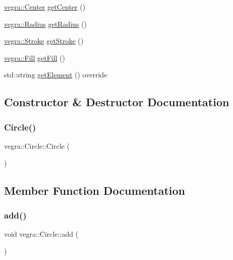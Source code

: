 \begin{DoxyCompactItemize}
\mbox{\hyperlink{structvegra_1_1Center}{vegra\+::\+Center}} \mbox{\hyperlink{structvegra_1_1Circle_a8dd74def2123ae009053c067f653380d}{get\+Center}} ()
\item 
\mbox{\hyperlink{structvegra_1_1Radius}{vegra\+::\+Radius}} \mbox{\hyperlink{structvegra_1_1Circle_ad9eb941c53b548d6944e8d95f9ff1328}{get\+Radius}} ()
\item 
\mbox{\hyperlink{structvegra_1_1Stroke}{vegra\+::\+Stroke}} \mbox{\hyperlink{structvegra_1_1Circle_ab0ab83cb024a9b236c87194fdada9055}{get\+Stroke}} ()
\item 
\mbox{\hyperlink{structvegra_1_1Fill}{vegra\+::\+Fill}} \mbox{\hyperlink{structvegra_1_1Circle_a8f68bc2e3f0469a479d5314b81aeffc8}{get\+Fill}} ()
\item 
std\+::string \mbox{\hyperlink{structvegra_1_1Circle_a50bdbe7e4b29530b131e7a1157190b00}{get\+Element}} () override
\end{DoxyCompactItemize}


\subsection{Constructor \& Destructor Documentation}
\mbox{\label{structvegra_1_1Circle_a30b817f23ffab115eda5d1d1a36d0a9b}} 
\subsubsection{\texorpdfstring{Circle()}{Circle()}}
{\footnotesize\ttfamily vegra\+::\+Circle\+::\+Circle (\begin{DoxyParamCaption}{ }\end{DoxyParamCaption})\hspace{0.3cm}{\ttfamily [inline]}}



\subsection{Member Function Documentation}
\mbox{\label{structvegra_1_1Circle_adcfee7bc2183fb2173bc9a27659457bf}} 
\subsubsection{\texorpdfstring{add()}{add()}\hspace{0.1cm}{\footnotesize\ttfamily [1/3]}}
{\footnotesize\ttfamily void vegra\+::\+Circle\+::add (\begin{DoxyParamCaption}{ }\end{DoxyParamCaption})\hspace{0.3cm}{\ttfamily [inline]}}

